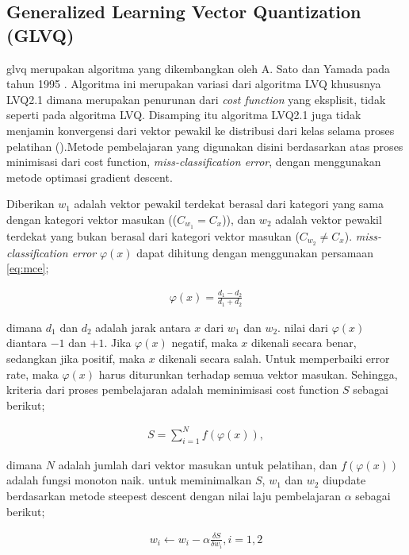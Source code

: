 \subsection{Generalized Learning Vector Quantization (GLVQ)}
\label{ssec:glvq}

\Gls{glvq} merupakan algoritma yang dikembangkan oleh A. Sato dan Yamada pada
tahun 1995 \cite{Sato:1995}. Algoritma ini merupakan variasi dari algoritma LVQ
khususnya LVQ2.1 dimana merupakan penurunan dari \textit{cost function} yang
eksplisit, tidak seperti pada algoritma LVQ. Disamping itu algoritma LVQ2.1 juga
tidak menjamin konvergensi dari vektor pewakil ke distribusi dari kelas selama
proses pelatihan (\cite{Sato:1995, Sato:1998}).Metode pembelajaran yang
digunakan disini berdasarkan atas proses minimisasi dari cost function,
\emph{miss-classification error}, dengan menggunakan metode optimasi gradient
descent.

Diberikan $w_1$ adalah vektor pewakil terdekat berasal dari kategori yang sama
dengan kategori vektor masukan (($C_{w_1} = C_x$)), dan $w_2$ adalah vektor
pewakil terdekat yang bukan berasal dari kategori vektor masukan ($C_{w_2} \neq
C_x$). \emph{miss-classification error} $\varphi(x)$ dapat dihitung dengan
menggunakan persamaan \ref{eq:mce};
 
\begin{align}
\label{eq:mce}
	\varphi(x) = \frac{d_1 - d_2}{d_1 + d_2}
\end{align}

\noindent dimana $d_1$ dan $d_2$ adalah jarak antara $x$ dari $w_1$ dan $w_2$.
nilai dari $\varphi(x)$ diantara $-1$ dan $+1$. Jika $\varphi(x)$ negatif, maka
$x$ dikenali secara benar, sedangkan jika positif, maka $x$ dikenali secara
salah. Untuk memperbaiki error rate, maka $\varphi(x)$ harus diturunkan terhadap
semua vektor masukan. Sehingga, kriteria dari proses pembelajaran adalah
meminimisasi cost function $S$ sebagai berikut;

\begin{align}
\label{eq:costS}
	S = \sum_{i=1}^{N} f(\varphi(x)), 
\end{align}

\noindent dimana $N$ adalah jumlah dari vektor masukan untuk pelatihan, dan
$f(\varphi(x))$ adalah fungsi monoton naik. untuk meminimalkan $S$, $w_1$ dan
$w_2$ diupdate berdasarkan metode steepest descent dengan nilai laju
pembelajaran $\alpha$ sebagai berikut;

\begin{align}
\label{eq:genuprule}
	w_i \leftarrow w_i - \alpha \frac{\delta S}{\delta w_i}, i = 1, 2
\end{align}


